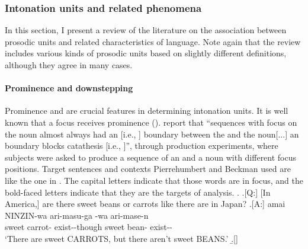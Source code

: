 

\subsubsection{Intonation units and related phenomena}

In this section,
I present a review of the literature on the association between prosodic units and related characteristics of language.
Note again that
the review includes various kinds of prosodic units
based on slightly different definitions,
although they agree in many cases.

\paragraph{Prominence and downstepping}

Prominence and  are crucial features in determining intonation units.
It is well known that
a focus receives prominence ().
 report that
``sequences with focus on the noun almost always had an  [i.e., ] boundary between the  and the noun[...] an  boundary blocks catathesis [i.e., ]'',
through production experiments,
where subjects were asked to produce a sequence of an  and a noun with different focus positions.
Target sentences and contexts Pierrehumbert and Beckman used are like the one in \Next.
The capital letters indicate that those words are in focus, and
the bold-faced letters indicate that they are the targets of analysis.
%
%
\ex.
 \a.[Q:] [In America,] are there sweet beans or carrots like there are in Japan?
 \bg.[A:] amai {NINZIN}-wa ari-masu-ga  -wa ari-mase-n \\
          sweet carrot- exist--though sweet bean- exist-- \\
      `There are sweet CARROTS, but there aren't sweet BEANS.'
 \b.[]   \hfill{\cite[59]{pierrehumbertbeckman88}}

